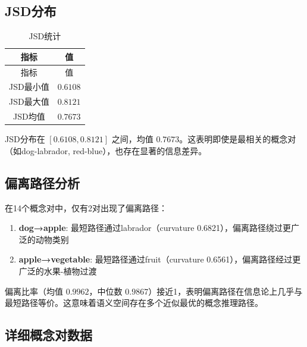 \documentclass[UTF8,fontset=mac]{ctexart}
\begin{document}
\subsection{JSD分布}\label{jsd-results}

\begin{longtable}[]{@{}cc@{}}
\caption{JSD统计}\tabularnewline
\toprule\noalign{}
指标 & 值 \\
\midrule\noalign{}
\endfirsthead
\toprule\noalign{}
指标 & 值 \\
\midrule\noalign{}
\endhead
\bottomrule\noalign{}
\endlastfoot
JSD最小值 & \(0.6108\) \\
JSD最大值 & \(0.8121\) \\
JSD均值 & \(0.7673\) \\
\end{longtable}

JSD分布在 \([0.6108, 0.8121]\) 之间，均值 \(0.7673\)。这表明即使是最相关的概念对（如dog-labrador, red-blue），也存在显著的信息差异。

\subsection{偏离路径分析}\label{detour-results}

在14个概念对中，仅有2对出现了偏离路径：

\begin{enumerate}
\item
  \textbf{dog→apple}: 最短路径通过labrador（curvature 0.6821），偏离路径绕过更广泛的动物类别
\item
  \textbf{apple→vegetable}: 最短路径通过fruit（curvature 0.6561），偏离路径经过更广泛的水果-植物过渡
\end{enumerate}

偏离比率（均值 \(0.9962\)，中位数 \(0.9867\)）接近1，表明偏离路径在信息论上几乎与最短路径等价。这意味着语义空间存在多个近似最优的概念推理路径。

\subsection{详细概念对数据}\label{pair-data}
\end{document}
